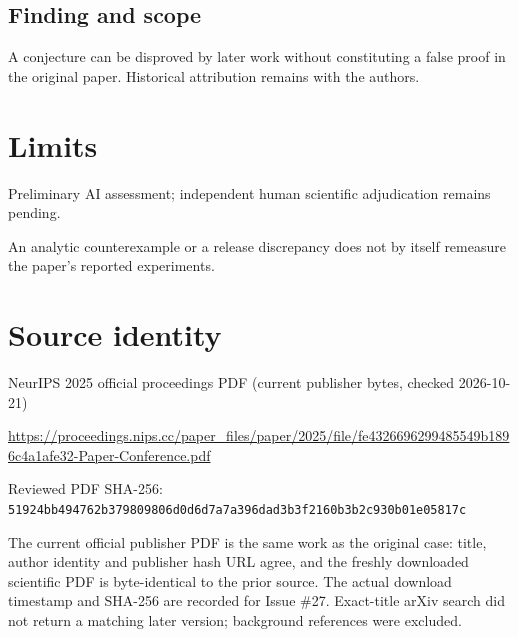 \documentclass[11pt]{article}
\begin{document}
\subsection*{Finding and scope}

A conjecture can be disproved by later work without constituting a false proof in the original paper. Historical attribution remains with the authors.

\section*{Limits}

Preliminary AI assessment; independent human scientific adjudication remains pending.\par

An analytic counterexample or a release discrepancy does not by itself remeasure the paper’s reported experiments.\par

\section*{Source identity}

NeurIPS 2025 official proceedings PDF (current publisher bytes, checked 2026-10-21)

\url{https://proceedings.nips.cc/paper_files/paper/2025/file/fe4326696299485549b1896c4a1afe32-Paper-Conference.pdf}

Reviewed PDF SHA-256: \nolinkurl{51924bb494762b379809806d0d6d7a7a396dad3b3f2160b3b2c930b01e05817c}

The current official publisher PDF is the same work as the original case: title, author identity and publisher hash URL agree, and the freshly downloaded scientific PDF is byte-identical to the prior source. The actual download timestamp and SHA-256 are recorded for Issue \#27. Exact-title arXiv search did not return a matching later version; background references were excluded.
\end{document}
